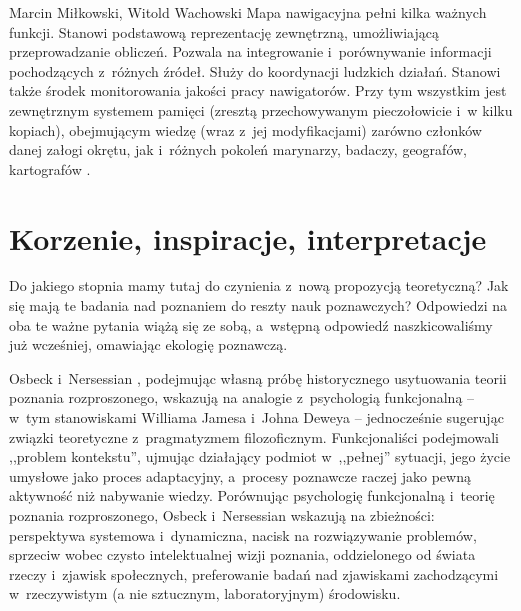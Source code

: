 \begin{artplenv2auth}{Marcin Miłkowski, Witold Wachowski}
Mapa nawigacyjna pełni kilka ważnych funkcji. Stanowi podstawową reprezentację zewnętrzną, umożliwiającą przeprowadzanie obliczeń. Pozwala na integrowanie i~porównywanie informacji pochodzących z~różnych źródeł. Służy do koordynacji ludzkich działań. Stanowi także środek monitorowania jakości pracy nawigatorów. Przy tym wszystkim jest zewnętrznym systemem pamięci (zresztą przechowywanym pieczołowicie i~w kilku kopiach), obejmującym wiedzę (wraz z~jej modyfikacjami) zarówno członków danej załogi okrętu, jak i~różnych pokoleń marynarzy, badaczy, geografów, kartografów
\parencites[][s.~93–98]{afeltowicz_how_2015}[][s.~61–143]{hutchins_cognition_1995}.%


\section{Korzenie, inspiracje, interpretacje}

Do jakiego stopnia mamy tutaj do czynienia z~nową propozycją teoretyczną? Jak się mają te badania nad poznaniem do reszty nauk poznawczych? Odpowiedzi na oba te ważne pytania wiążą się ze sobą, a~wstępną odpowiedź naszkicowaliśmy już wcześniej, omawiając ekologię poznawczą.

Osbeck i~Nersessian
\parencite*[][]{osbeck_situating_2014}, %
 podejmując własną próbę historycznego usytuowania teorii poznania rozproszonego, wskazują na analogie z~psychologią funkcjonalną -- w~tym stanowiskami Williama Jamesa i~Johna Deweya -- jednocześnie sugerując związki teoretyczne z~pragmatyzmem filozoficznym. Funkcjonaliści podejmowali ,,problem kontekstu'', ujmując działający podmiot w~,,pełnej'' sytuacji, jego życie umysłowe jako proces adaptacyjny, a~procesy poznawcze raczej jako pewną aktywność niż nabywanie wiedzy. Porównując psychologię funkcjonalną i~teorię poznania rozproszonego, Osbeck i~Nersessian wskazują na zbieżności: perspektywa systemowa i~dynamiczna, nacisk na rozwiązywanie problemów, sprzeciw wobec czysto intelektualnej wizji poznania, oddzielonego od świata rzeczy i~zjawisk społecznych, preferowanie badań nad zjawiskami zachodzącymi w~rzeczywistym (a nie sztucznym, laboratoryjnym) środowisku.


\end{artplenv2auth}
